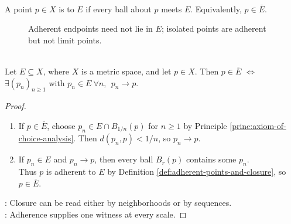 \begin{definition} \label{def:adherent-points-and-closure} \\
A point $p\in X$ is  to $E$ if every ball about $p$ meets $E$. Equivalently, $p\in\overline{E}$.
\end{definition}

\begin{figure}[H]
  \centering
  
  \caption{Adherent endpoints need not lie in $E$; isolated points are adherent but not limit points.}
  \label{fig:adherent-limit-isolated-points}
\end{figure}

\begin{proposition} \label{prop:sequential-closure-criterion} \\
Let $E\subseteq X$, where $X$ is a metric space, and let $p\in X$. Then $p\in\overline{E}$ $\Longleftrightarrow$ $\exists (p_n)_{n\geq1}$ with $p_n\in E\ \forall n,\ \ p_n\to p$.
\begin{proof}
\begin{enumerate}[label=\roman*.]
\setlength{\itemsep}{0pt}
\item[$(\Rightarrow)$] If $p\in\overline{E}$, choose $p_n\in E\cap B_{1/n}(p)$ for $n\geq1$ by Principle \ref{princ:axiom-of-choice-analysis}. Then $d(p_n,p)<1/n$, so $p_n\to p$.
\item[$(\Leftarrow)$] If $p_n\in E$ and $p_n\to p$, then every ball $B_r(p)$ contains some $p_n$.\\
Thus $p$ is adherent to $E$ by Definition \ref{def:adherent-points-and-closure}, so $p\in\overline{E}$.
\end{enumerate}
: Closure can be read either by neighborhoods or by sequences.\\
: Adherence supplies one witness at every scale.
\end{proof}
\end{proposition}

